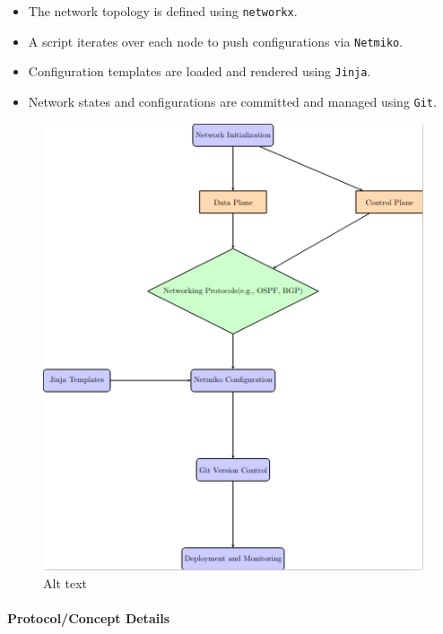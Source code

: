 \documentclass[11pt]{article}
\providecommand{\tightlist}{%
      \setlength{\itemsep}{0pt}\setlength{\parskip}{0pt}}
\begin{document}
\begin{itemize}
\tightlist
\item
  The network topology is defined using \texttt{networkx}.\\
\item
  A script iterates over each node to push configurations via
  \texttt{Netmiko}.\\
\item
  Configuration templates are loaded and rendered using
  \texttt{Jinja}.\\
\item
  Network states and configurations are committed and managed using
  \texttt{Git}.
\end{itemize}

    \begin{figure}
\centering
\includegraphics{Screenshot 2024-11-18 at 19-31-01 tad - Online LaTeX Editor Overleaf.png}
\caption{Alt text}
\end{figure}

    \hypertarget{protocolconcept-details}{%
\paragraph{Protocol/Concept Details}\label{protocolconcept-details}}
\end{document}
